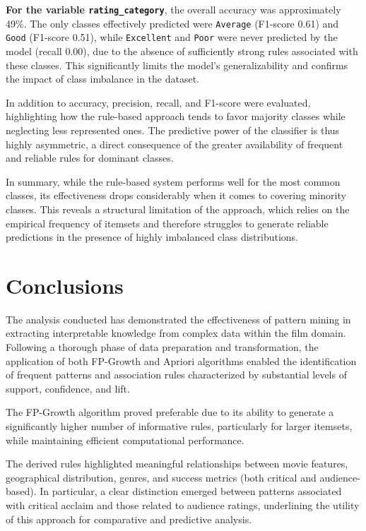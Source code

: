 \documentclass{article}
\begin{document}
\textbf{For the variable \texttt{rating\_category}}, the overall accuracy was approximately 49\%. The only classes effectively predicted were \texttt{Average} (F1-score 0.61) and \texttt{Good} (F1-score 0.51), while \texttt{Excellent} and \texttt{Poor} were never predicted by the model (recall 0.00), due to the absence of sufficiently strong rules associated with these classes. This significantly limits the model's generalizability and confirms the impact of class imbalance in the dataset.

In addition to accuracy, precision, recall, and F1-score were evaluated, highlighting how the rule-based approach tends to favor majority classes while neglecting less represented ones. The predictive power of the classifier is thus highly asymmetric, a direct consequence of the greater availability of frequent and reliable rules for dominant classes.

In summary, while the rule-based system performs well for the most common classes, its effectiveness drops considerably when it comes to covering minority classes. This reveals a structural limitation of the approach, which relies on the empirical frequency of itemsets and therefore struggles to generate reliable predictions in the presence of highly imbalanced class distributions.

\section{Conclusions}

The analysis conducted has demonstrated the effectiveness of pattern mining in extracting interpretable knowledge from complex data within the film domain. Following a thorough phase of data preparation and transformation, the application of both FP-Growth and Apriori algorithms enabled the identification of frequent patterns and association rules characterized by substantial levels of support, confidence, and lift.

The FP-Growth algorithm proved preferable due to its ability to generate a significantly higher number of informative rules, particularly for larger itemsets, while maintaining efficient computational performance.

The derived rules highlighted meaningful relationships between movie features, geographical distribution, genres, and success metrics (both critical and audience-based). In particular, a clear distinction emerged between patterns associated with critical acclaim and those related to audience ratings, underlining the utility of this approach for comparative and predictive analysis.
\end{document}
